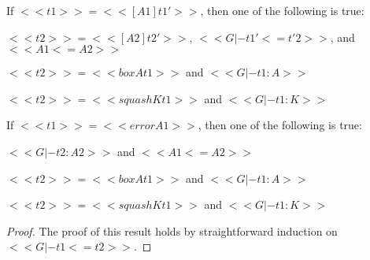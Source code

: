 \begin{lemma}
\begin{enumR}
  \item If $<<t1>> = << [A1]t1'>>$,
    then one of the following is true:
    \begin{enumA}
    \item $<<t2>> = << [A2]t2'>>$, $<<G |- t1' <= t'2>>$, and $<<A1 <= A2>>$
    \item $<<t2>> = <<box A t1>>$ and $<<G |- t1 : A>>$
    \item $<<t2>> = <<squash K t1>>$ and $<<G |- t1 : K>>$
    \end{enumA}

  \item If $<<t1>> = <<error A1>>$,
    then one of the following is true:
    \begin{enumA}
    \item $<<G |- t2 : A2>>$ and $<<A1 <= A2>>$
    \item $<<t2>> = <<box A t1>>$ and $<<G |- t1 : A>>$
    \item $<<t2>> = <<squash K t1>>$ and $<<G |- t1 : K>>$
    \end{enumA}
  \end{enumR}
\end{lemma}
\begin{proof}
  The proof of this result holds by straightforward induction
  on $<<G |- t1 <= t2>>$.
\end{proof}
